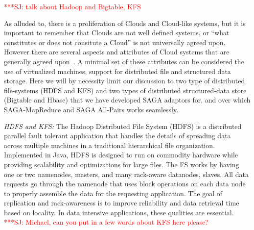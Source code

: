 \documentclass[conference,final]{IEEEtran}
\newcommand{\jhanote}[1]{ {\textcolor{red} { ***SJ: #1 }}}
\newcommand{\jhanote}[1]{}
\newcommand{\sagamapreduce }{SAGA-MapReduce }
\begin{document}
\jhanote{talk about Hadoop and Bigtable, KFS}

As alluded to, there is a proliferation of Clouds and Cloud-like
systems, but it is important to remember that Clouds are not well
defined systems, or ``what constitutes or does not consitute a Cloud''
is not universally agreed upon.  However there are several aspects and
attributes of Cloud systems that are generally agreed
upon~\cite{buyya_hpcc}. A minimal set of these attributes can be
considered the use of virtualized machines, support for distributed
file and structured data storage.  Here we will by necessity limit our
discussion to two type of distributed file-systems (HDFS and KFS) and
two types of distributed structured-data store (Bigtable and Hbase)
that we have developed SAGA adaptors for, and over which
\sagamapreduce and SAGA All-Pairs works seamlessly.




{\it HDFS and KFS: }The Hadoop Distributed File System (HDFS) is a
distributed parallel fault tolerant application that handles the
details of spreading data across multiple machines in a traditional
hierarchical file organization.  %
Implemented in Java, HDFS is designed to run on commodity hardware
while providing scalability and optimizations for large files.  The
FS works by having one or two namenodes, masters, and many
rack-aware datanodes, slaves.  All data requests go through the
namenode that uses block operations on each data node to properly
assemble the data for the requesting application.  The goal of
replication and rack-awareness is to improve reliability and data
retrieval time based on locality.  In data intensive applications,
these qualities are essential. \jhanote{Michael, can you put in a few
  words about KFS here please?}
\end{document}
